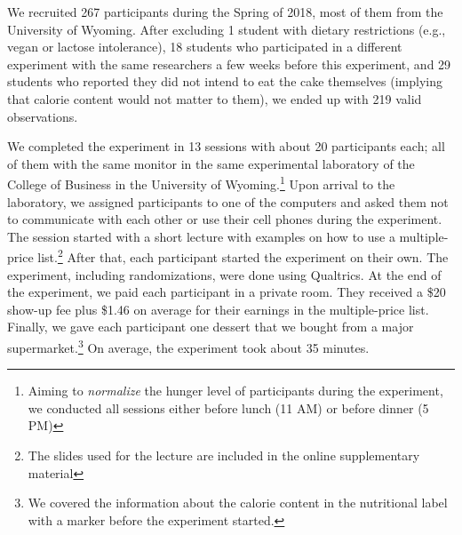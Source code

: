 %
%
% 

We recruited 267 participants during the Spring of 2018, most of them from the University of Wyoming. After excluding 1 student with dietary restrictions (e.g., vegan or lactose intolerance), 18 students who participated in a different experiment with the same researchers a few weeks before this experiment, and 29 students who reported they did not intend to eat the cake themselves (implying that calorie content would not matter to them), we ended up with 219 valid observations.

We completed the experiment in 13 sessions with about 20 participants each; all of them with the same monitor in the same experimental laboratory of the College of Business in the University of Wyoming.\footnote{Aiming to \emph{normalize} the hunger level of participants during the experiment, we conducted all sessions either before lunch (11 AM) or before dinner (5 PM)} Upon arrival to the laboratory, we assigned participants to one of the computers and asked them not to communicate with each other or use their cell phones during the experiment. The session started with a short lecture with examples on how to use a multiple-price list.\footnote{The slides used for the lecture are included in the online supplementary material} After that, each participant started the experiment on their own. The experiment, including randomizations, were done using Qualtrics. At the end of the experiment, we paid each participant in a private room. They received a \$20 show-up fee plus \$1.46 on average for their earnings in the multiple-price list. Finally, we gave each participant one dessert that we bought from a major supermarket.\footnote{We covered the information about the calorie content in the nutritional label with a marker before the experiment started.} On average, the experiment took about 35 minutes.

% 
